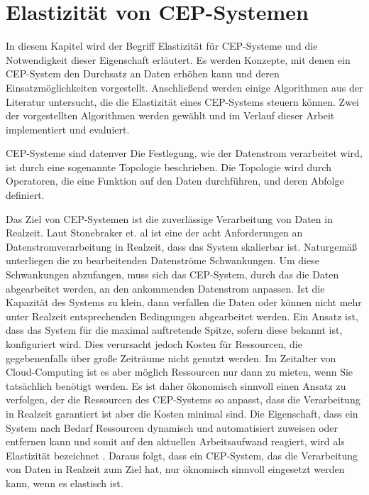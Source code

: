 \chapter{Elastizität von CEP-Systemen}

In diesem Kapitel wird der Begriff Elastizität für CEP-Systeme und die Notwendigkeit dieser Eigenschaft erläutert.
Es werden Konzepte, mit denen ein CEP-System den Durchsatz an Daten erhöhen kann und deren Einsatzmöglichkeiten vorgestellt.
Anschließend werden einige Algorithmen aus der Literatur untersucht, die die Elastizität eines CEP-Systems steuern können.
Zwei der vorgestellten Algorithmen werden gewählt und im Verlauf dieser Arbeit implementiert und evaluiert.

CEP-Systeme sind datenver
Die Festlegung, wie der Datenstrom verarbeitet wird, ist durch eine sogenannte Topologie beschrieben.
Die Topologie wird durch Operatoren, die eine Funktion auf den Daten durchführen, und deren Abfolge definiert.

Das Ziel von CEP-Systemen ist die zuverlässige Verarbeitung von Daten in Realzeit.
Laut Stonebraker et. al \cite{Laut Stonebraker et. al} ist eine der acht Anforderungen an Datenstromverarbeitung in Realzeit, dass das System skalierbar ist.
Naturgemäß unterliegen die zu bearbeitenden Datenströme Schwankungen.
Um diese Schwankungen abzufangen, muss sich das CEP-System, durch das die Daten abgearbeitet werden, an den ankommenden Datenstrom anpassen.
Ist die Kapazität des Systems zu klein, dann verfallen die Daten oder können nicht mehr unter Realzeit entsprechenden Bedingungen abgearbeitet werden.
Ein Ansatz ist, dass das System für die maximal auftretende Spitze, sofern diese bekannt ist, konfiguriert wird.
Dies verursacht jedoch Kosten für Ressourcen, die gegebenenfalls über große Zeiträume nicht genutzt werden.
Im Zeitalter von Cloud-Computing ist es aber möglich Ressourcen nur dann zu mieten, wenn Sie tatsächlich benötigt werden.
Es ist daher ökonomisch sinnvoll einen Ansatz zu verfolgen, der die Ressourcen des CEP-Systems so anpasst, dass die Verarbeitung in Realzeit garantiert ist aber die Kosten minimal sind.
Die Eigenschaft, dass ein System nach Bedarf Ressourcen dynamisch und automatisiert zuweisen oder entfernen kann und somit auf den aktuellen Arbeitsaufwand reagiert, wird als Elastizität bezeichnet \cite{herbst_elasticity_nodate}.
Daraus folgt, dass ein CEP-System, das die Verarbeitung von Daten in Realzeit zum Ziel hat, nur öknomisch sinnvoll eingesetzt werden kann, wenn es elastisch ist.

